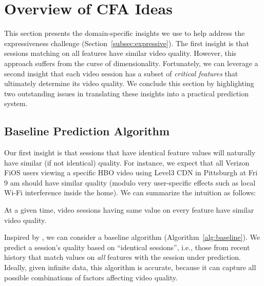 \section{Overview of CFA Ideas}
\label{sec:cfa:outline}


This section presents the domain-specific insights we use to 
help address the expressiveness challenge 
(Section~\ref{subsec:expressive}).  
The first insight is that sessions matching on all features 
have similar video quality.  
However, this approach suffers from the curse of dimensionality.
Fortunately,  we can leverage a second insight that 
each video session has a subset of {\em critical features} 
that ultimately determine its video quality. 
We conclude this section  by highlighting two outstanding 
issues in translating these insights into  a practical 
prediction system.



\subsection{Baseline Prediction Algorithm}
\label{subsec:cfa:outline:basic}

Our  first insight is that 
sessions that have identical  feature values will 
naturally have similar (if not identical) quality. 
 For instance, we expect that all Verizon 
 FiOS users  viewing a specific  HBO  video 
using Level3 CDN in Pittsburgh at Fri 9 am should 
have similar quality (modulo very user-specific  effects 
such as local Wi-Fi interference inside the home).
We can summarize the intuition as follows:

\begin{insight}
\vspace{0.1cm}
At a given time, video sessions having same value 
on every feature have similar video quality.
\vspace{-0.2cm}
\label{insight:1}
\end{insight}


Inspired by , we can consider a 
baseline algorithm (Algorithm~\ref{alg:baseline}).
We predict a session's quality based on ``identical
sessions'', i.e., those from recent history that match 
values on {\em all} features with the session under 
prediction. 
Ideally, given infinite data, this 
algorithm is accurate, because it can capture
all possible combinations of factors affecting 
video quality.


